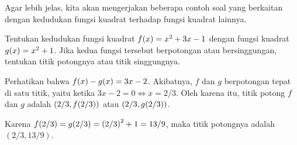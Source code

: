 		\par Agar lebih jelas, kita akan mengerjakan beberapa contoh soal yang berkaitan dengan kedudukan fungsi kuadrat terhadap fungsi kuadrat lainnya.
		
		\begin{contoh}
			Tentukan kedudukan fungsi kuadrat $ \mathop{}\!{f}{\left({x}\right)} = x^{2} + 3x - 1 $ dengan fungsi kuadrat $ \mathop{}\!{g}{\left({x}\right)} = x^{2} + 1 $. Jika kedua fungsi tersebut berpotongan atau bersinggungan, tentukan titik potongnya atau titik singgungnya.
		\end{contoh}
		\begin{jawab}
			Perhatikan bahwa $ \mathop{}\!{f}{\left({x}\right)} - \mathop{}\!{g}{\left({x}\right)} = 3x - 2 $. Akibatnya, $ f $ dan $ g $ berpotongan tepat di satu titik, yaitu ketika $ 3x - 2 = 0 \iff x = 2/3 $. Oleh karena itu, titik potong $ f $ dan $ g $ adalah $ \left(2/3, \mathop{}\!{f}{\left({2/3}\right)}\right) $ atau $ \left(2/3, \mathop{}\!{g}{\left({2/3}\right)}\right) $.
			\par Karena $ \mathop{}\!{f}{\left({2/3}\right)} = \mathop{}\!{g}{\left({2/3}\right)} = \left(2/3\right)^{2} + 1 = 13/9 $, maka titik potongnya adalah $ \left(2/3, 13/9\right) $.
		\end{jawab}
		
